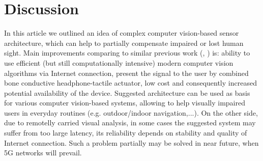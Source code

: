 \documentclass[10pt,conference,compsocconf]{IEEEtran}
\begin{document}
\section{Discussion}
\label{sec:discussion}


In this article we outlined an idea of complex computer vision-based sensor architecture, which can help to partially compensate impaired or lost human sight. Main improvements comparing to similar previous work (\cite{?}, \cite{?}) is: ability to use efficient (but still computationally intensive) modern computer vision algorithms via Internet connection, present the signal to the user by combined bone conductive headphone-tactile actuator, low cost and consequently increased potential availability of the device. Suggested architecture can be used as basis for various computer vision-based systems, allowing to help visually impaired users in everyday routines (e.g. outdoor/indoor navigation,...). On the other side, due to remotelly carried visual analysis, in some cases the suggested system may suffer from too large latency, its reliability depends on stability and quality of Internet connection. Such a problem partially may be solved in near future, when 5G networks will prevail.







\end{document}
